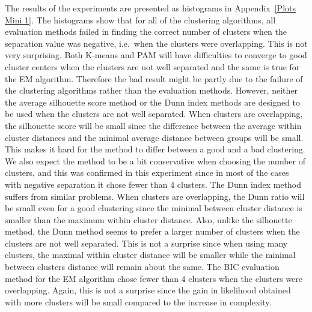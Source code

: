 \documentclass[11pt,twoside,swedish]{article}
\begin{document}
The results of the experiments are presented as histograms in
Appendix~\ref{Plots Mini 1}. The histograms show that for all of the
clustering algorithms, all evaluation methods failed in finding the
correct number of clusters when the separation value was negative,
i.e.\ when the clusters were overlapping. This is not very
surprising. Both K-means and PAM will have difficulties to converge to
good cluster centers when the clusters are not well separated and the
same is true for the EM algorithm. Therefore the bad result might be
partly due to the failure of the clustering algorithms rather than the
evaluation methods. However, neither the average silhouette score
method or the Dunn index methods are designed to be used when the
clusters are not well separated. When clusters are overlapping, the
silhouette score will be small since the difference between the
average within cluster distances and the minimal average distance
between groups will be small. This makes it hard for the method to
differ between a good and a bad clustering. We also expect the method
to be a bit conservative when choosing the number of clusters, and
this was confirmed in this experiment since in most of the cases with
negative separation it chose fewer than 4 clusters. The Dunn index
method suffers from similar problems. When clusters are overlapping,
the Dunn ratio will be small even for a good clustering since the
minimal between cluster distance is smaller than the maximum within
cluster distance. Also, unlike the silhouette method, the Dunn method
seems to prefer a larger number of clusters when the clusters are not
well separated. This is not a surprise since when using many clusters,
the maximal within cluster distance will be smaller while the minimal
between clusters distance will remain about the same. The BIC
evaluation method for the EM algorithm chose fewer than 4 clusters
when the clusters were overlapping. Again, this is not a surprise
since the gain in likelihood obtained with more clusters will be small
compared to the increase in complexity.
\end{document}
